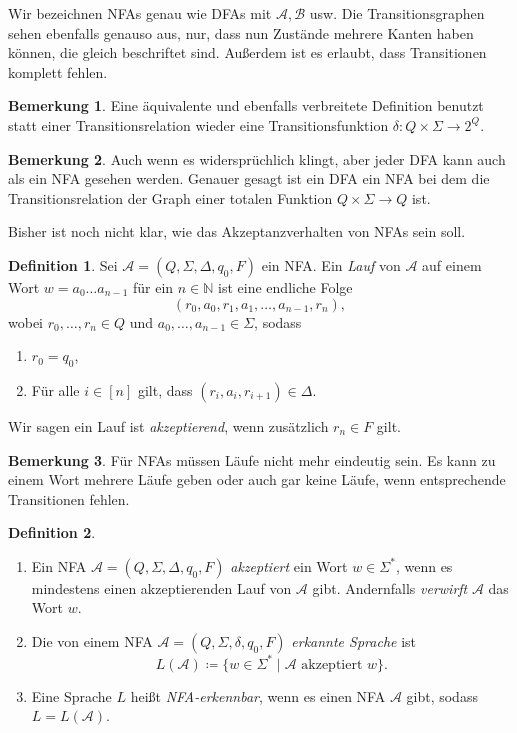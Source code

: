 \documentclass[11pt, a4paper]{article}
\theoremstyle{definition}
\newtheorem{definition}{Definition}[section]
\newtheorem*{remark*}{Bemerkung}
\theoremstyle{plain}
\numberwithin{equation}{section}
\begin{document}
Wir bezeichnen NFAs genau wie DFAs mit \( \mathcal{A}, \mathcal{B} \) usw. Die Transitionsgraphen sehen ebenfalls genauso aus, nur, dass nun Zustände mehrere Kanten haben können, die gleich beschriftet sind. Außerdem ist es erlaubt, dass Transitionen komplett fehlen.
\begin{remark*}
	Eine äquivalente und ebenfalls verbreitete Definition benutzt statt einer Transitionsrelation wieder eine Transitionsfunktion \( \delta\colon Q \times \Sigma \to 2^Q \). 
\end{remark*}
\begin{remark*}
	Auch wenn es widersprüchlich klingt, aber jeder DFA kann auch als ein NFA gesehen werden. Genauer gesagt ist ein DFA ein NFA bei dem die Transitionsrelation der Graph einer totalen Funktion \( Q \times \Sigma \to Q \) ist.
\end{remark*}
Bisher ist noch nicht klar, wie das Akzeptanzverhalten von NFAs sein soll.
\begin{definition}
	Sei \( \mathcal{A} = (Q, \Sigma, \Delta, q_0, F) \) ein NFA.
	Ein \textit{Lauf} von \( \mathcal{A} \) auf einem Wort \( w = a_0 \ldots a_{n-1} \) für ein \( n \in \mathbb{N} \) ist eine endliche Folge
	\[
		(r_0, a_0, r_1, a_1, \ldots, a_{n-1}, r_n),
	\]
	wobei \( r_0, \ldots, r_n \in Q \) und \( a_0, \ldots, a_{n-1} \in \Sigma \), sodass
	\begin{enumerate}
		\item \( r_0 = q_0 \),
		\item Für alle \( i \in [n] \) gilt, dass \( (r_i, a_i, r_{i+1}) \in \Delta \).
	\end{enumerate}
	Wir sagen ein Lauf ist \textit{akzeptierend}, wenn zusätzlich \( r_n \in F \) gilt.
\end{definition}
\begin{remark*}
	Für NFAs müssen Läufe nicht mehr eindeutig sein. Es kann zu einem Wort mehrere Läufe geben oder auch gar keine Läufe, wenn entsprechende Transitionen fehlen.
\end{remark*}
\begin{definition}
\
	\begin{enumerate}
		\item Ein NFA \( \mathcal{A} = (Q, \Sigma, \Delta, q_0, F) \) \textit{akzeptiert} ein Wort \( w \in \Sigma^\ast \), wenn es mindestens einen akzeptierenden Lauf von \( \mathcal{A} \) gibt. Andernfalls \textit{verwirft} \( \mathcal{A} \) das Wort \( w \).
		\item Die von einem NFA \( \mathcal{A} = (Q, \Sigma, \delta, q_0, F) \) \textit{erkannte Sprache} ist
			\[
				L(\mathcal{A}) \coloneqq \{ w \in \Sigma^\ast \mid \mathcal{A} \text{ akzeptiert } w \}.
			\]
		\item Eine Sprache \( L \) heißt \textit{NFA-erkennbar}, wenn es einen NFA \( \mathcal{A} \) gibt, sodass \( L = L(\mathcal{A}) \).
	\end{enumerate}
\end{definition}
\end{document}
